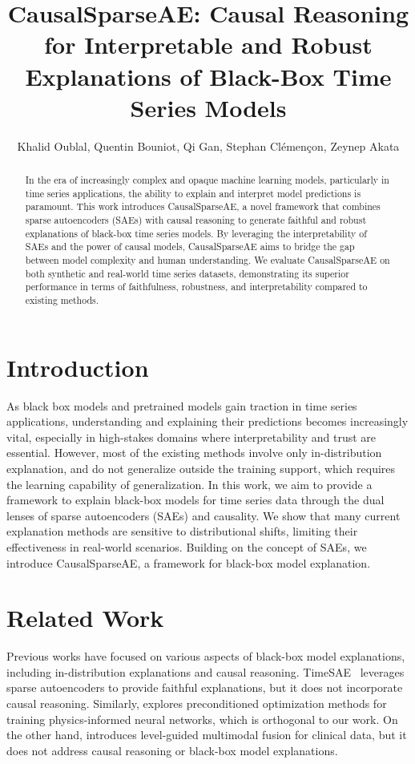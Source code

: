 \documentclass{article}
\title{CausalSparseAE: Causal Reasoning for Interpretable and Robust Explanations of Black-Box Time Series Models}
\author{Khalid Oublal, Quentin Bouniot, Qi Gan, Stephan Clémençon, Zeynep Akata}
\date{}
\begin{document}
\maketitle

\begin{abstract}
In the era of increasingly complex and opaque machine learning models, particularly in time series applications, the ability to explain and interpret model predictions is paramount. This work introduces CausalSparseAE, a novel framework that combines sparse autoencoders (SAEs) with causal reasoning to generate faithful and robust explanations of black-box time series models. By leveraging the interpretability of SAEs and the power of causal models, CausalSparseAE aims to bridge the gap between model complexity and human understanding. We evaluate CausalSparseAE on both synthetic and real-world time series datasets, demonstrating its superior performance in terms of faithfulness, robustness, and interpretability compared to existing methods.
\end{abstract}

\section{Introduction}
\label{sec:introduction}

As black box models and pretrained models gain traction in time series applications, understanding and explaining their predictions becomes increasingly vital, especially in high-stakes domains where interpretability and trust are essential. However, most of the existing methods involve only in-distribution explanation, and do not generalize outside the training support, which requires the learning capability of generalization. In this work, we aim to provide a framework to explain black-box models for time series data through the dual lenses of sparse autoencoders (SAEs) and causality. We show that many current explanation methods are sensitive to distributional shifts, limiting their effectiveness in real-world scenarios. Building on the concept of SAEs, we introduce CausalSparseAE, a framework for black-box model explanation. 

\section{Related Work}
\label{sec:related_work}

Previous works have focused on various aspects of black-box model explanations, including in-distribution explanations and causal reasoning. TimeSAE~\cite{oublal2026timesaesparsedecodingfaithful} leverages sparse autoencoders to provide faithful explanations, but it does not incorporate causal reasoning. Similarly, \cite{salvadóbenasco2026multipreconditionedlbfgstrainingfinitebasis} explores preconditioned optimization methods for training physics-informed neural networks, which is orthogonal to our work. On the other hand, \cite{kim2026lemoflevelguidedmfforheterogeneousclinicaldata} introduces level-guided multimodal fusion for clinical data, but it does not address causal reasoning or black-box model explanations. 
\end{document}
